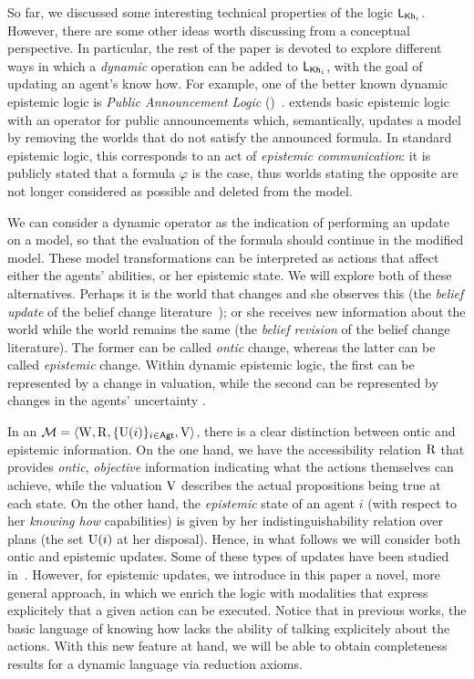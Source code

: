 So far, we discussed some interesting technical properties of the logic $\mathsf{L}_{{\sf Kh}_i}$. However, there are some other ideas worth discussing from a conceptual perspective. In particular, the rest of the paper is devoted to explore different ways in which a \emph{dynamic} operation can be added to $\mathsf{L}_{{\sf Kh}_i}$, with the goal of updating an agent's know how.   For example, one of the better known dynamic epistemic logic is \emph{Public Announcement Logic} (\PAL)~\cite{Plaza89:lopc}.  \PAL extends basic epistemic logic with an operator for public announcements which, semantically, updates a model by removing the worlds that do not satisfy the announced formula. In standard epistemic logic, this corresponds to an act of \emph{epistemic communication}: it is publicly stated that a formula $\varphi$ is the case, thus worlds stating the opposite are not longer considered as possible and deleted from the model.

We can consider a dynamic operator as the indication of performing an update on a model, so that the evaluation of the formula should continue in the modified model.  These model transformations can be interpreted as actions that affect either the agents' abilities, or her epistemic state. We will explore both of these alternatives.
Perhaps it is the world that changes and she observes this (the \emph{belief update} of the belief change literature~\cite{sep-logic-belief-revision}); or she receives new information about the world while the world remains the same (the \emph{belief revision} of the belief change literature). The former can be called \emph{ontic} change, whereas the latter can be called \emph{epistemic} change. Within dynamic epistemic logic, the first can be represented by a change in valuation, while the second can be represented by changes in the agents' uncertainty \cite{vanDitmarschKooi2008}.

In an \ults $\mathcal{M}=\langle \operatorname{W},\operatorname{R},\{ \operatorname{U}(i) \}_{i\in{\rm \sf Agt}},\operatorname{V} \rangle$, there is a clear distinction between ontic and epistemic information. On the one hand, we have the accessibility relation $\operatorname{R}$ that provides \emph{ontic}, \emph{objective} information indicating what the actions themselves can achieve, while the valuation $\operatorname{V}$ describes the actual propositions being true at each state. On the other hand, the \emph{epistemic} state of an agent $i$ (with respect to her \emph{knowing how} capabilities) is given by her indistinguishability relation over plans (the set $\operatorname{U}(i)$ at her disposal). Hence, in what follows we will consider both ontic and epistemic updates. Some of these types of updates have been studied in~\cite{AFSV22}. However, for epistemic updates, we introduce in this paper a novel, more general approach, in which we enrich the logic with modalities that express explicitely that a given action can be executed. Notice that in previous works, the basic language of knowing how lacks the ability of talking explicitely about the actions. With this new feature at hand, we will be able to obtain completeness results for a dynamic language via reduction axioms.
